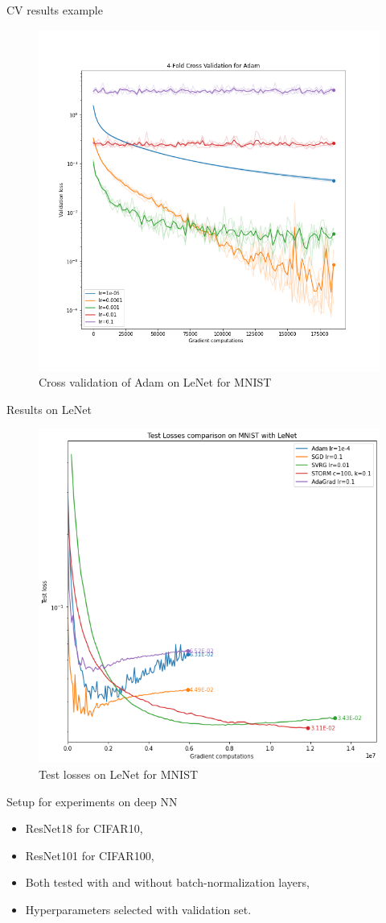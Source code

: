\documentclass[10pt]{beamer}
\begin{document}
\begin{frame}{CV results example}
    \begin{figure}
        \centering
        \includegraphics[width=.65\textwidth]{report/midterm presentation/images/adamCV.png}
        \caption{Cross validation of Adam on LeNet for MNIST}
        \label{fig:AdamCVLeNet}
    \end{figure}
    
\end{frame}

\begin{frame}{Results on LeNet}
    \begin{figure}
        \centering
        \includegraphics[width=.6\textwidth]{report/figures/MNISTresultsOnlyTest.png}
        \caption{Test losses on LeNet for MNIST}
    \end{figure}
\end{frame}

\begin{frame}{Setup for experiments on deep NN}
    \begin{itemize}
        \item ResNet18 for CIFAR10,
        \item ResNet101 for CIFAR100,
        \item Both tested with and without batch-normalization layers,
        \item Hyperparameters selected with validation set.
    \end{itemize}
\end{frame}
\end{document}
